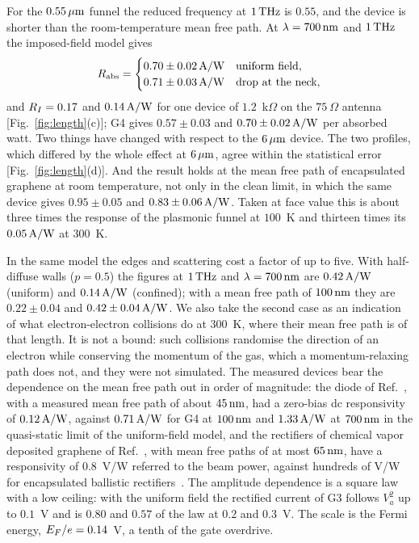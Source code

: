 For the $0.55\,\mu\mathrm{m}$ funnel the reduced frequency at $1\,\mathrm{THz}$ is $0.55$, and
the device is shorter than the room-temperature mean free path. At
$\lambda=700\,\mathrm{nm}$ and $1\,\mathrm{THz}$ the imposed-field model gives
\begin{equation}
R_{\mathrm{abs}}=
\begin{cases}
0.70\pm0.02\,\mathrm{A/W} & \text{uniform field},\\
0.71\pm0.03\,\mathrm{A/W} & \text{drop at the neck},
\end{cases}
\label{eq:imposed}
\end{equation}
and $R_{I}=0.17$ and $0.14\,\mathrm{A/W}$ for one device of $1.2$~k$\Omega$ on the
$75\ \Omega$ antenna [Fig.~\ref{fig:length}(c)]; G4 gives $0.57\pm0.03$ and
$0.70\pm0.02\,\mathrm{A/W}$ per absorbed watt. Two things have changed with respect to
the $6\,\mu\mathrm{m}$ device. The two profiles, which differed by the whole effect at
$6\,\mu\mathrm{m}$, agree within the statistical error [Fig.~\ref{fig:length}(d)]. And
the result holds at the mean free path of encapsulated graphene at room
temperature, not only in the clean limit, in which the same device gives
$0.95\pm0.05$ and $0.83\pm0.06\,\mathrm{A/W}$. Taken at face value this is about
three times the response of the plasmonic funnel at $100$~K and thirteen
times its $0.05\,\mathrm{A/W}$ at $300$~K.

In the same model the edges and scattering cost a factor of up to five.
With half-diffuse walls ($p=0.5$) the figures at $1\,\mathrm{THz}$ and
$\lambda=700\,\mathrm{nm}$ are $0.42\,\mathrm{A/W}$ (uniform) and $0.14\,\mathrm{A/W}$ (confined); with a
mean free path of $100\,\mathrm{nm}$ they are $0.22\pm0.04$ and
$0.42\pm0.04\,\mathrm{A/W}$. We also take the second case as an indication of what
electron-electron collisions do at $300$~K, where their mean free path
is of that length. It is not a bound: such collisions randomise the
direction of an electron while conserving the momentum of the gas,
which a momentum-relaxing path does not, and they were not simulated.
The measured
devices bear the dependence on the mean free path out in order of
magnitude: the diode of Ref.~\cite{zhu2013graphene}, with a measured mean
free path of about $45\,\mathrm{nm}$, had a zero-bias dc responsivity of $0.12\,\mathrm{A/W}$,
against $0.71\,\mathrm{A/W}$ for G4 at $100\,\mathrm{nm}$ and $1.33\,\mathrm{A/W}$ at $700\,\mathrm{nm}$ in the
quasi-static limit of the uniform-field model, and the rectifiers of
chemical vapor deposited graphene of Ref.~\cite{hemmetter2026enhanced},
with mean free paths of at most $65\,\mathrm{nm}$, have a responsivity of $0.8$~V/W
referred to the beam power, against hundreds of V/W for encapsulated
ballistic rectifiers~\cite{auton2017terahertz}. The amplitude dependence
is a square law with a low ceiling: with the uniform field the rectified
current of G3 follows $V_{a}^{2}$ up to $0.1$~V and is $0.80$ and $0.57$ of
the law at $0.2$ and $0.3$~V. The scale is the Fermi energy,
$E_{F}/e=0.14$~V, a tenth of the gate overdrive.

